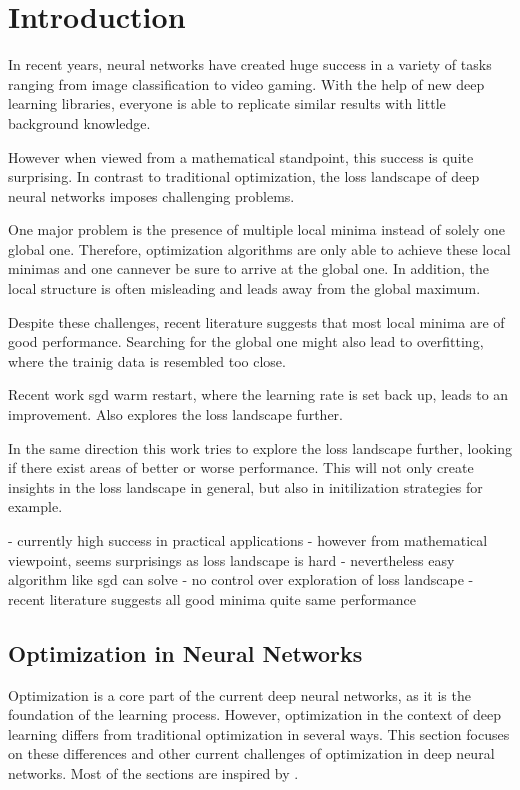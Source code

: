 \chapter{Introduction}
In recent years, neural networks have created huge success in a variety of tasks
ranging from image classification to video gaming. With the help of new deep
learning libraries, everyone is able to replicate similar results with little
background knowledge.

However when viewed from a mathematical standpoint, this success is quite
surprising. In contrast to traditional optimization, the loss landscape of deep
neural networks imposes challenging problems. 

One major problem is the presence of multiple local minima instead of solely one
global one. Therefore, optimization algorithms are only able to achieve these
local minimas and one cannever be  sure to arrive at the global one. In
addition, the local structure is often misleading and leads away from the global
maximum.

Despite these challenges, recent literature suggests that most local minima are
of good performance. Searching for the global one might also lead to
overfitting, where the trainig data is resembled too close. 


Recent work sgd warm restart, where the learning rate is set back up, leads to
an improvement. Also explores the loss landscape further. 


In the same direction this work tries to explore the loss landscape further,
looking if there exist areas of better or worse performance. This will not only
create insights in the loss landscape in general, but also in initilization
strategies for example.








- currently high  success in practical applications
- however from mathematical viewpoint, seems surprisings as loss landscape is hard
- nevertheless easy  algorithm like sgd can solve
- no control over exploration of loss landscape
- recent literature suggests all good minima quite same performance











\section{Optimization in Neural Networks}
Optimization is a core part of the current deep neural networks, as it is the
foundation of the learning process. However, optimization in the context of deep
learning differs from traditional optimization in several ways. This section
focuses on these differences and other current challenges of optimization in
deep neural networks. Most of the sections are inspired by
\cite{Goodfellow-et-al-2016}.

